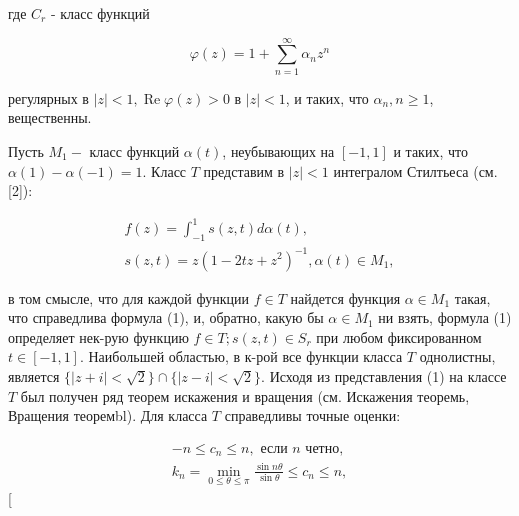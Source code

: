 \documentclass[10pt]{article}
\begin{document}
где $C_{r}$ - класс функций



\[

\varphi(z)=1+\sum_{n=1}^{\infty} \alpha_{n} z^{n}

\]



регулярных в $|z|<1, \operatorname{Re} \varphi(z)>0$ в $|z|<1$, и таких, что $\alpha_{n}, n \geqslant 1$, вещественны.



Пусть $M_{1}-$ класс функций $\alpha(t)$, неубывающих на $[-1,1]$ и таких, что $\alpha(1)-\alpha(-1)=1$. Класс $T$ представим в $|z|<1$ интегралом Стилтьеса (см. [2]):



\[

\begin{gathered}

f(z)=\int_{-1}^{1} s(z, t) d \alpha(t), \\

s(z, t)=z\left(1-2 t z+z^{2}\right)^{-1}, \alpha(t) \in M_{1},

\end{gathered}

\]



в том смысле, что для каждой функции $f \in T$ найдется функция $\alpha \in M_{1}$ такая, что справедлива формула (1), и, обратно, какую бы $\alpha \in M_{1}$ ни взять, формула (1) определяет нек-рую функцию $f \in T ; s(z, t) \in S_{r}$ при любом фиксированном $t \in[-1,1]$. Наибольшей областью, в к-рой все функции класса $T$ однолистны, является $\{|z+i|<\sqrt{2}\} \cap\{|z-i|<\sqrt{2}\}$. Исходя из представления (1) на классе $T$ был получен ряд теорем искажения и вращения (см. Искажения теоремь, Вращения теоремbl). Для класса $T$ справедливы точные оценки:



\[

\begin{gathered}

-n \leqslant c_{n} \leqslant n, \text { если } n \text { четно, } \\

k_{n}=\min _{0 \leqslant \theta \leqslant \pi} \frac{\sin n \theta}{\sin \theta} \leqslant c_{n} \leqslant n,

\end{gathered}

\][
\end{document}
